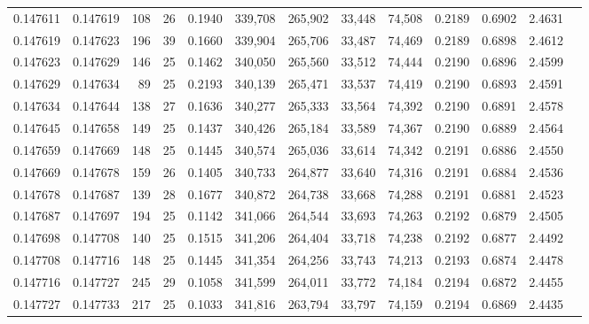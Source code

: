 \begin{tabular}{rrrrrrrrrrrrr}
0.147611 & 0.147619 & 108 &  26 &                                     0.1940 & 339,708 & 265,902 &  33,448 &  74,508 & 0.2189 & 0.6902 & 2.4631 \\
0.147619 & 0.147623 & 196 &  39 &                                     0.1660 & 339,904 & 265,706 &  33,487 &  74,469 & 0.2189 & 0.6898 & 2.4612 \\
0.147623 & 0.147629 & 146 &  25 &                                     0.1462 & 340,050 & 265,560 &  33,512 &  74,444 & 0.2190 & 0.6896 & 2.4599 \\
0.147629 & 0.147634 &  89 &  25 &                                     0.2193 & 340,139 & 265,471 &  33,537 &  74,419 & 0.2190 & 0.6893 & 2.4591 \\
0.147634 & 0.147644 & 138 &  27 &                                     0.1636 & 340,277 & 265,333 &  33,564 &  74,392 & 0.2190 & 0.6891 & 2.4578 \\
0.147645 & 0.147658 & 149 &  25 &                                     0.1437 & 340,426 & 265,184 &  33,589 &  74,367 & 0.2190 & 0.6889 & 2.4564 \\
0.147659 & 0.147669 & 148 &  25 &                                     0.1445 & 340,574 & 265,036 &  33,614 &  74,342 & 0.2191 & 0.6886 & 2.4550 \\
0.147669 & 0.147678 & 159 &  26 &                                     0.1405 & 340,733 & 264,877 &  33,640 &  74,316 & 0.2191 & 0.6884 & 2.4536 \\
0.147678 & 0.147687 & 139 &  28 &                                     0.1677 & 340,872 & 264,738 &  33,668 &  74,288 & 0.2191 & 0.6881 & 2.4523 \\
0.147687 & 0.147697 & 194 &  25 &                                     0.1142 & 341,066 & 264,544 &  33,693 &  74,263 & 0.2192 & 0.6879 & 2.4505 \\
0.147698 & 0.147708 & 140 &  25 &                                     0.1515 & 341,206 & 264,404 &  33,718 &  74,238 & 0.2192 & 0.6877 & 2.4492 \\
0.147708 & 0.147716 & 148 &  25 &                                     0.1445 & 341,354 & 264,256 &  33,743 &  74,213 & 0.2193 & 0.6874 & 2.4478 \\
0.147716 & 0.147727 & 245 &  29 &                                     0.1058 & 341,599 & 264,011 &  33,772 &  74,184 & 0.2194 & 0.6872 & 2.4455 \\
0.147727 & 0.147733 & 217 &  25 &                                     0.1033 & 341,816 & 263,794 &  33,797 &  74,159 & 0.2194 & 0.6869 & 2.4435 \\

\end{tabular}
